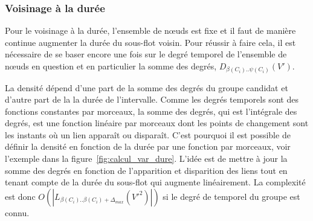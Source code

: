 \subsubsection{Voisinage à la durée}
Pour le voisinage à la durée, l'ensemble de n\oe{}uds est fixe et il faut de manière continue augmenter la durée du sous-flot voisin.
Pour réussir à faire cela, il est nécessaire de se baser encore une fois sur le degré temporel de l'ensemble de n\oe{}uds en question et en particulier la somme des degrés, $D_{\beta(C_i)..\psi(C_i)}(V')$.

La densité dépend d'une part de la somme des degrés du groupe candidat et d'autre part de la la durée de l'intervalle.
Comme les degrés temporels sont des fonctions constantes par morceaux, la somme des degrés, qui est l'intégrale des degrés, est une fonction linéaire par morceaux dont les points de changement sont les instants où un lien apparaît ou disparaît.
C'est pourquoi il est possible de définir la densité en fonction de la durée par une fonction par morceaux, voir l'exemple dans la figure~\ref{fig:calcul_var_dure}.
L'idée est de mettre à jour la somme des degrés en fonction de l'apparition et disparition des liens tout en tenant compte de la durée du sous-flot qui augmente linéairement.
La complexité est donc $O(|L_{\beta(C_i)..\beta(C_i)+\Delta_{max}}(V'^2)|)$ si le degré de temporel du groupe est connu.

